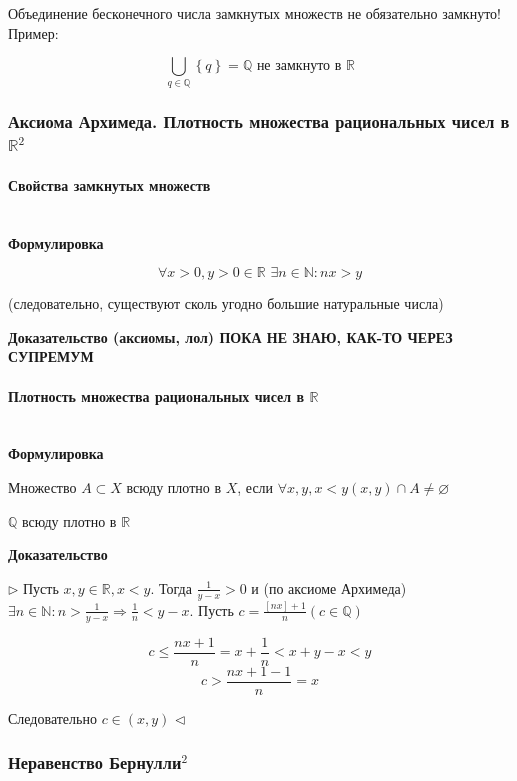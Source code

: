 \documentclass{article}
\def\dbl{\,\,}
\let\vanillaparagraph\paragraph
\renewcommand{\paragraph}[1]{\vanillaparagraph{#1}\mbox{}\\}
\begin{document}
Объединение бесконечного числа замкнутых множеств не обязательно замкнуто! Пример:

\begin{equation*}
\bigcup_{q \in \mathbb{Q}}{\left\{q\right\}} = \mathbb{Q} \text{ не замкнуто в } \mathbb{R}
\end{equation*} 

\subsubsection{Аксиома Архимеда. Плотность множества рациональных чисел в \texorpdfstring{$\mathbb R$}{R}\texorpdfstring{$^2$}{}}

\paragraph{Свойства замкнутых множеств}
\textbf{Формулировка}

\begin{equation*}
    \forall x > 0, y > 0 \in \mathbb{R} \dbl \exists n \in \mathbb{N} : nx > y
\end{equation*}

(следовательно, существуют сколь угодно большие натуральные числа)

\textbf{Доказательство (аксиомы, лол) ПОКА НЕ ЗНАЮ, КАК-ТО ЧЕРЕЗ СУПРЕМУМ}

\paragraph{Плотность множества рациональных чисел в \texorpdfstring{$\mathbb R$}{R}}
\textbf{Формулировка}

Множество $A \subset X$ всюду плотно в $X$, если $\forall x, y, x < y (x, y) \cap A \neq \varnothing$

$\mathbb{Q}$ всюду плотно в $\mathbb{R}$

\textbf{Доказательство}

$\rhd$ Пусть $x, y \in \mathbb{R}, x < y$. Тогда $\frac{1}{y - x} > 0$ и (по аксиоме Архимеда) $\exists n \in \mathbb{N} : n > \frac{1}{y - x} \Rightarrow \frac{1}{n} < y - x$. Пусть $c = \frac{[nx] + 1}{n} 
\left(c \in \mathbb{Q}\right)$

\[c \le \frac{nx + 1}{n} = x + \frac{1}{n} < x + y - x < y \]
\[c > \frac{nx + 1 - 1}{n} = x\]

Следовательно $c \in (x, y)$ $\lhd$

\subsubsection{Неравенство Бернулли\texorpdfstring{$^2$}{}}
\end{document}
